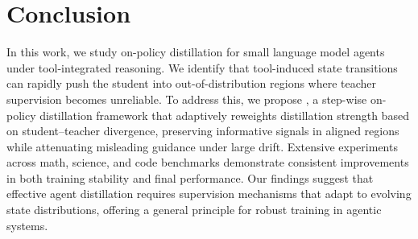 \section{Conclusion}\label{sec:conclusion}


In this work, we study on-policy distillation for small language model agents under tool-integrated reasoning. We identify that tool-induced state transitions can rapidly push the student into out-of-distribution regions where teacher supervision becomes unreliable. To address this, we propose \ourmodel, a step-wise on-policy distillation framework that adaptively reweights distillation strength based on student–teacher divergence, preserving informative signals in aligned regions while attenuating misleading guidance under large drift. Extensive experiments across math, science, and code benchmarks demonstrate consistent improvements in both training stability and final performance. Our findings suggest that effective agent distillation requires supervision mechanisms that adapt to evolving state distributions, offering a general principle for robust training in agentic systems.
